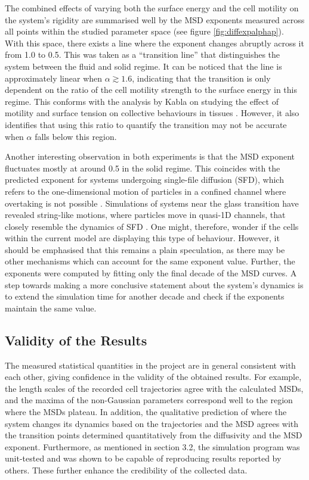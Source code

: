 \documentclass[a4paper,12pt]{article}
\begin{document}
The combined effects of varying both the surface energy and the cell motility on the system's rigidity are summarised well by the MSD exponents measured across all points within the studied parameter space (see figure \ref{fig:diffexpalphap}). With this space, there exists a line where the exponent changes abruptly across it from 1.0 to 0.5. This was taken as a ``transition line'' that distinguishes the system between the fluid and solid regime. It can be noticed that the line is approximately linear when $\alpha \gtrsim 1.6$, indicating that the transition is only dependent on the ratio of the cell motility strength to the surface energy in this regime. This conforms with the analysis by Kabla on studying the effect of motility and surface tension on collective behaviours in tissues \cite{kabla2012}. However, it also identifies that using this ratio to quantify the transition may not be accurate when $\alpha$ falls below this region.  

Another interesting observation in both experiments is that the MSD exponent fluctuates mostly at around 0.5 in the solid regime.  This coincides with the predicted exponent for systems undergoing single-file diffusion (SFD), which refers to the one-dimensional motion of particles in a confined channel where overtaking is not possible \cite{levitt1973}. Simulations of systems near the glass transition have revealed string-like motions, where particles move in quasi-1D channels, that closely resemble the dynamics of SFD \cite{donati1998}. One might, therefore, wonder if the cells within the current model are displaying this type of behaviour. However, it should be emphasised that this remains a plain speculation, as there may be other mechanisms which can account for the same exponent value. Further, the exponents were computed by fitting only the final decade of the MSD curves. A step towards making a more conclusive statement about the system's dynamics is to extend the simulation time for another decade and check if the exponents maintain the same value. 


\subsection{Validity of the Results}
The measured statistical quantities in the project are in general consistent with each other, giving confidence in the validity of the obtained results. For example, the length scales of the recorded cell trajectories agree with the calculated MSDs, and the maxima of the non-Gaussian parameters correspond well to the region where the MSDs plateau. In addition, the qualitative prediction of where the system changes its dynamics based on the trajectories and the MSD agrees with the transition points determined quantitatively from the diffusivity and the MSD exponent. Furthermore, as mentioned in section 3.2, the simulation program was unit-tested and was shown to be capable of reproducing results reported by others. These further enhance the credibility of the collected data. 
\end{document}
